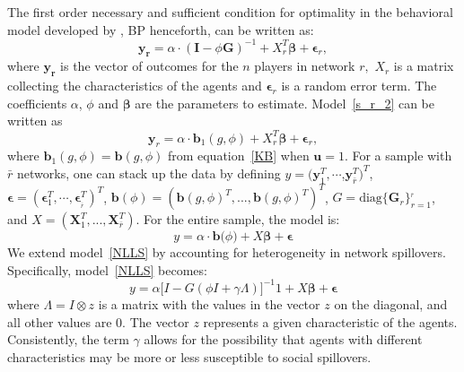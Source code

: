 \documentclass[nojss]{jss}
\begin{document}
The first order necessary and sufficient condition for optimality in the behavioral model developed by \cite{Battaglini+Patacchini:2018}, BP henceforth, can be written as:
\begin{equation}
\mathbf{y}_{\mathbf{r}}=\alpha \cdot \left( \boldsymbol{I}-\phi \boldsymbol{G%
}\right) ^{-1}+X_{r}^{T}\mathbf{\beta }+\mathbf{\epsilon }_{r},
\label{s_r_2}
\end{equation}
where $\mathbf{y}_{\mathbf{r}}$ is the vector of outcomes for the $n$ players in network $r\mathbf{,}$ $X_{r}$ is a matrix collecting the characteristics of the agents and $\mathbf{\epsilon }_{r}$ is a random error term. The coefficients $\alpha $, $\phi $ and $\mathbf{\beta }$ are the parameters to estimate. Model~\ref{s_r_2} can be written as
\begin{equation}
\mathbf{y}_{r}=\alpha \cdot \boldsymbol{b}_{1}\left( g,\phi \right)
+X_{r}^{T}\mathbf{\beta }+\mathbf{\epsilon }_{r},
\end{equation}%
where $\boldsymbol{b}_{1}\left(g,\phi \right) =\boldsymbol{b}\left(g,\phi
\right) $ from equation~\ref{KB} when $\boldsymbol{u}=1$.\newline
For a sample with $\bar{r}$ networks, one can stack up the data by defining $y=(\mathbf{y}_{1}^{T},\cdots$,$\mathbf{y}_{\bar{r}}^{T})^{T}$, $\mathbf{\epsilon }=(\boldsymbol{\epsilon }_{1}^{T},\cdots ,\boldsymbol{\epsilon }_{_{\bar{r}}}^{T})^{T}$, $\mathbf{b}(\phi)=\left(\boldsymbol{b}\left(g,\phi \right)^{T},...,\boldsymbol{b}\left(g,\phi\right)^{T}\right) ^{T}$, $G=\mathrm{diag}\{\boldsymbol{G}_{r}\}_{r=1}^{_{\bar{r}}}$, and $X=(\boldsymbol{X}_{1}^{T},...,\boldsymbol{X}_{\overline{r}}^{T})$. For the entire sample, the model is: 
\begin{equation}
y=\alpha \cdot \mathbf{b(}\phi \mathbf{)}+X\mathbf{\beta}+\mathbf{\epsilon }  \label{NLLS}
\end{equation}
We extend model~\ref{NLLS} by accounting for heterogeneity in network spillovers. Specifically, model~\ref{NLLS} becomes:
\begin{equation}
y=\alpha \lbrack I-G(\phi I+\gamma \Lambda )]^{-1}1+X\mathbf{\beta }+\mathbf{\epsilon }  
\label{BP_2}
\end{equation}
where $\Lambda =I\otimes z$ is a matrix with the values in the vector $z$ on the diagonal, and all other values are 0. The vector $z$ represents a given characteristic of the agents. Consistently, the term $\gamma$ allows for the possibility that agents with different characteristics may be more or less susceptible to social spillovers.
\end{document}
